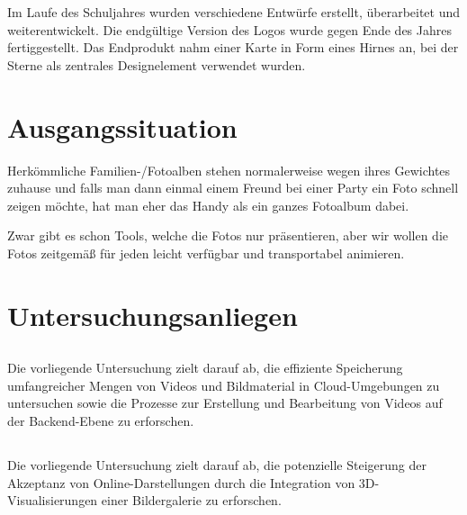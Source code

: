 Im Laufe des Schuljahres wurden verschiedene Entwürfe erstellt, überarbeitet und 
weiterentwickelt. Die endgültige Version des Logos wurde gegen Ende des Jahres 
fertiggestellt. Das Endprodukt nahm einer Karte in Form eines Hirnes an, bei der 
Sterne als zentrales Designelement verwendet wurden.

\newpage

\section{Ausgangssituation}

Herkömmliche Familien-/Fotoalben stehen normalerweise wegen ihres Gewichtes 
zuhause und falls man dann einmal einem Freund bei einer Party ein Foto schnell 
zeigen möchte, hat man eher das Handy als ein ganzes Fotoalbum dabei.

Zwar gibt es schon Tools, welche die Fotos nur präsentieren, 
aber wir wollen die Fotos zeitgemä\ss{} für jeden leicht verfügbar und transportabel animieren.

\section{Untersuchungsanliegen}

\subsection{\firstauthor}

Die vorliegende Untersuchung zielt darauf ab, die effiziente Speicherung 
umfangreicher Mengen von Videos und Bildmaterial in Cloud-Umgebungen zu 
untersuchen sowie die Prozesse zur Erstellung und Bearbeitung von Videos 
auf der Backend-Ebene zu erforschen.

\subsection{\secondauthor}

Die vorliegende Untersuchung zielt darauf ab, die potenzielle Steigerung 
der Akzeptanz von Online-Darstellungen durch die Integration von 
3D-Visualisierungen einer Bildergalerie zu erforschen.


